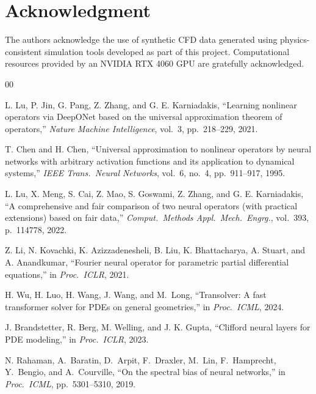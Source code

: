 \documentclass[conference]{IEEEtran}
\begin{document}
\section*{Acknowledgment}
The authors acknowledge the use of synthetic CFD data generated using physics-consistent simulation tools developed as part of this project. Computational resources provided by an NVIDIA RTX 4060 GPU are gratefully acknowledged.

\begin{thebibliography}{00}

L. Lu, P. Jin, G. Pang, Z. Zhang, and G. E. Karniadakis,
``Learning nonlinear operators via DeepONet based on the universal approximation theorem of operators,''
\textit{Nature Machine Intelligence}, vol.~3, pp.~218--229, 2021.

T. Chen and H. Chen,
``Universal approximation to nonlinear operators by neural networks with arbitrary activation functions and its application to dynamical systems,''
\textit{IEEE Trans.\ Neural Networks}, vol.~6, no.~4, pp.~911--917, 1995.

L. Lu, X. Meng, S. Cai, Z. Mao, S. Goswami, Z. Zhang, and G. E. Karniadakis,
``A comprehensive and fair comparison of two neural operators (with practical extensions) based on fair data,''
\textit{Comput.\ Methods Appl.\ Mech.\ Engrg.}, vol.~393, p.~114778, 2022.

Z. Li, N. Kovachki, K. Azizzadenesheli, B. Liu, K. Bhattacharya, A. Stuart, and A. Anandkumar,
``Fourier neural operator for parametric partial differential equations,''
in \textit{Proc.\ ICLR}, 2021.

H. Wu, H. Luo, H. Wang, J. Wang, and M.~Long,
``Transolver: A fast transformer solver for PDEs on general geometries,''
in \textit{Proc.\ ICML}, 2024.

J. Brandstetter, R. Berg, M. Welling, and J. K. Gupta,
``Clifford neural layers for PDE modeling,''
in \textit{Proc.\ ICLR}, 2023.

N. Rahaman, A.~Baratin, D.~Arpit, F.~Draxler, M.~Lin, F.~Hamprecht, Y.~Bengio, and A.~Courville,
``On the spectral bias of neural networks,''
in \textit{Proc.\ ICML}, pp.~5301--5310, 2019.


\end{thebibliography}
\end{document}
